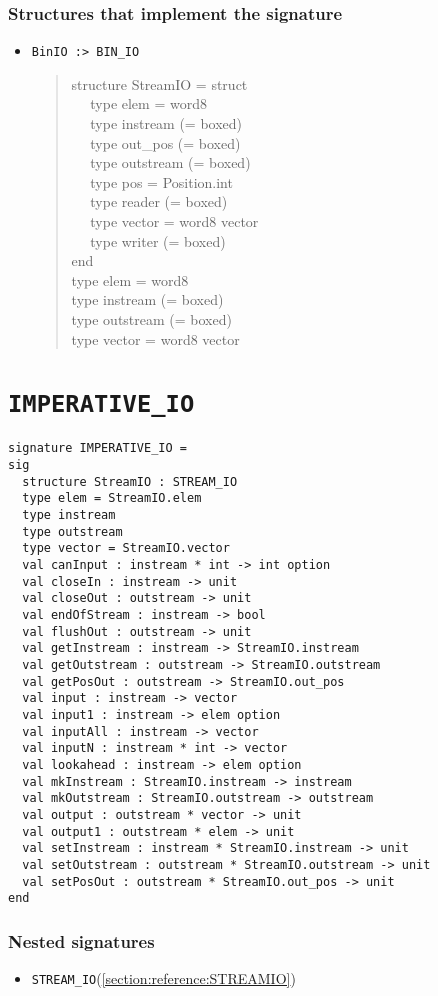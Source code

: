 \documentclass{jbook}
\newcommand{\txt}[2]{#2}
\newcommand{\code}[1]{\mbox{\large\tt #1}}
\newcommand{\myem}{\mbox{\ \ }}
\newenvironment{program}{\begin{quote}\begin{tt}}%
                        {\end{tt}\end{quote}}
\newcommand{\signature}[2]{
\section{{\tt #1}}\label{section:reference:#2}
}
\newcommand{\sigref}[1]{\ref{section:reference:#1}}
\newcommand{\Structure}{\subsubsection*{\txt{シグネチャを実装するストラクチャ}{Structures that implement the signature}}}
\newcommand{\NestedSignature}{\subsubsection*{\txt{ネストしたシグネチャ}{Nested signatures}}}
\begin{document}
\Structure
\begin{itemize}
\item \code{BinIO :> BIN\_IO}
\begin{program}
structure StreamIO = struct
\\\myem 
type elem = word8
\\\myem 
type instream (= boxed)
\\\myem 
type out\_pos (= boxed)
\\\myem 
type outstream (= boxed)
\\\myem 
type pos = Position.int
\\\myem 
type reader (= boxed)
\\\myem 
type vector = word8 vector
\\\myem 
type writer (= boxed)
\\
end\\
type elem = word8\\
type instream (= boxed)\\
type outstream (= boxed)\\
type vector = word8 vector\\
\end{program}
\end{itemize}

\signature{IMPERATIVE\_IO}{IMPERATIVEIO}
\begin{verbatim}
signature IMPERATIVE_IO =
sig
  structure StreamIO : STREAM_IO
  type elem = StreamIO.elem
  type instream
  type outstream
  type vector = StreamIO.vector
  val canInput : instream * int -> int option
  val closeIn : instream -> unit
  val closeOut : outstream -> unit
  val endOfStream : instream -> bool
  val flushOut : outstream -> unit
  val getInstream : instream -> StreamIO.instream
  val getOutstream : outstream -> StreamIO.outstream
  val getPosOut : outstream -> StreamIO.out_pos
  val input : instream -> vector
  val input1 : instream -> elem option
  val inputAll : instream -> vector
  val inputN : instream * int -> vector
  val lookahead : instream -> elem option
  val mkInstream : StreamIO.instream -> instream
  val mkOutstream : StreamIO.outstream -> outstream
  val output : outstream * vector -> unit
  val output1 : outstream * elem -> unit
  val setInstream : instream * StreamIO.instream -> unit
  val setOutstream : outstream * StreamIO.outstream -> unit
  val setPosOut : outstream * StreamIO.out_pos -> unit
end
\end{verbatim}

\NestedSignature
\begin{itemize}
\item \code{STREAM\_IO}(\sigref{STREAMIO})
\end{itemize}
\end{document}
